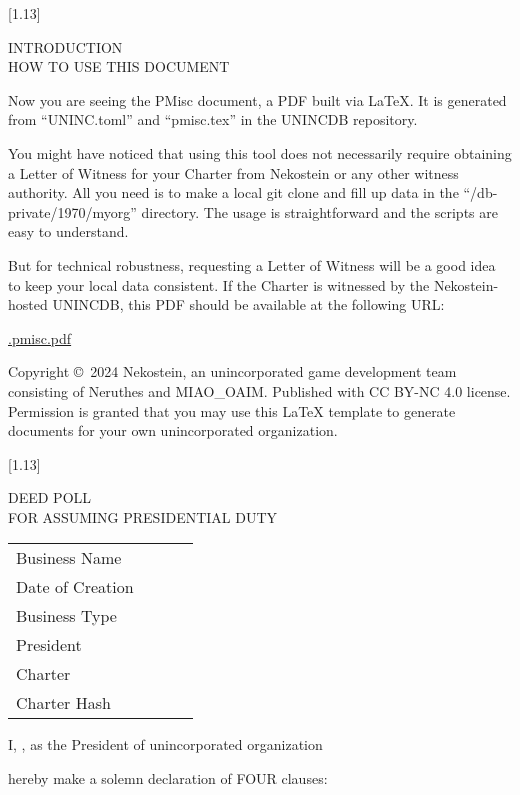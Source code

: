 \documentclass[11pt,a4paper,hidelinks]{article}
\newcommand{\newdochere}[1]{
    \setcounter{page}{1}
    \setcounter{section}{0}
    \scalebox{1}[1.13]{%
        \parbox{\textwidth}{%
            \begin{center}%
                \normalsize\rmfamily\mdseries\strut%
                #1%
            \end{center}%
        }%
    }%
    \par
}
\newcommand{\stdorginfo}[0]{
    \parbox{\linewidth}{
        \tabcolsep=0pt
        \small
        \begin{tabu}{lX}
            \toprule
            \mdseries Business Name~~~~~~ & \fulltomldataATfullname \\
            \mdseries Date of Creation & \fulltomldataATdatecreation \\
            \mdseries Business Type & \fulltomldataATtype \\
            \mdseries President & \fulltomldataATpresident \\
            \mdseries Charter & \uninctomldataATwitnessFIRST \\
            \mdseries Charter Hash & \fulltomldataATcharterhash \\
            \bottomrule
        \end{tabu}
    }\par\vskip 10pt
}
\begin{document}
\newdochere{INTRODUCTION\\HOW TO USE THIS DOCUMENT}
\thispagestyle{empty}

Now you are seeing the PMisc document, a PDF built via \LaTeX.
It is generated from ``UNINC.toml'' and ``pmisc.tex'' in the UNINCDB repository.

You might have noticed that using this tool does not necessarily require obtaining a Letter of Witness
for your Charter from Nekostein or any other witness authority.
All you need is to make a local git clone and fill up data in the ``/db-private/1970/myorg'' directory.
The usage is straightforward and the scripts are easy to understand.

But for technical robustness, requesting a Letter of Witness will be a good idea to keep your local data consistent.
If the Charter is witnessed by the Nekostein-hosted UNINCDB,
this PDF should be available at the following URL:

\begin{center}
    \href{\unincdbaltdocprefix.pmisc.pdf}{\unincdbaltdocprefix.pmisc.pdf}
\end{center}

Copyright \copyright~2024 Nekostein, an unincorporated game development team consisting of Neruthes and MIAO\_OAIM.
Published with CC BY-NC 4.0 license.
Permission is granted that you may use this \LaTeX{} template to generate documents for your own unincorporated organization.






\clearpage
\newdochere{\MakeUppercase{DEED POLL\\For Assuming Presidential Duty}}
\thispagestyle{empty}

\stdorginfo

\strut I,
\underline{\fulltomldataATpresident},
as the President of unincorporated organization

\underline{\fulltomldataATfullname}

hereby make a solemn declaration of FOUR clauses:
\end{document}

